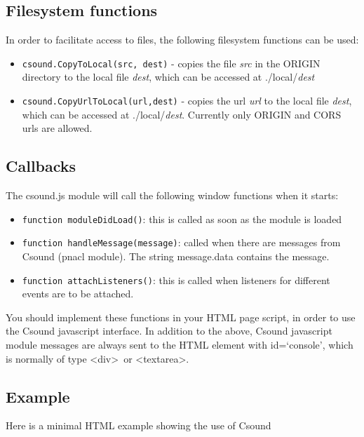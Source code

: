 \documentclass[11pt]{article}
\begin{document}
\subsection{Filesystem functions}

In order to facilitate access to files, the following filesystem functions can be used:

\begin{itemize}
\item {\tt csound.CopyToLocal(src, dest)} - copies the file \emph{src} in the ORIGIN directory to the local file \emph{dest}, which can
be accessed at ./local/\emph{dest}
\item {\tt csound.CopyUrlToLocal(url,dest)} - copies the url \emph{url} to the local file \emph{dest}, which can
be accessed at ./local/\emph{dest}. Currently only ORIGIN and CORS urls are allowed.
\end{itemize}


\subsection{Callbacks}

The csound.js module will call the following window functions when it starts:

\begin{itemize} 
\item {\tt function moduleDidLoad()}: this is called as soon as the module is loaded 
\item {\tt function handleMessage(message)}: called when there are messages from Csound (pnacl module). 
The string message.data contains the message.
\item {\tt function attachListeners()}: this is called when listeners for different events are to be attached. 
\end{itemize}

You should implement these functions in your HTML page script, in order to use the Csound javascript interface.
In addition to the above, Csound javascript module messages are always sent to the HTML element with id=`console', 
which is normally of type \textless div\textgreater \, or \textless textarea\textgreater .

\subsection{Example}

Here is a minimal HTML example showing the use of Csound


\end{document}
